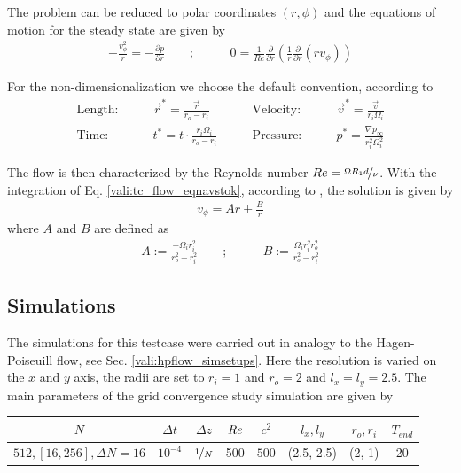 The problem can be reduced to polar coordinates $(r, \phi)$ and the equations of motion for the steady state are given by \citep{Kundu2012}
\begin{align}
    \label{vali:tc_flow_eqnavstok}
    -\frac{v^2_\phi}{r} = - \frac{\partial p}{\partial r} \qquad ;& \qquad 0 = \frac{1}{Re}\frac{\partial}{\partial r}\left(\frac{1}{r}\frac{\partial}{\partial r}(r v_\phi)\right)
\end{align}

\clearpage

For the non-dimensionalization we choose the default convention, according to  \citep{Chen2015}
\begin{align}
    \text{Length:}\qquad &  \vec{r}^* = \frac{\vec{r}}{r_o - r_i}  &
    \qquad \text{Velocity:}\qquad& \vec{v}^* =  \frac{\vec{v}}{r_i\Omega_i}\\
    \text{Time:}  \qquad & t^* = t \cdot \frac{r_i \Omega_i}{r_o - r_i}&
    \qquad  \text{Pressure:}\qquad & p^* = \frac{\nabla p_\infty}{r_i^2\Omega_i^2}
\end{align}


The flow is then characterized by the Reynolds number $Re = \nicefrac{\Omega R_1d}{\nu}$.
With the integration of Eq. \ref{vali:tc_flow_eqnavstok}, according to \citep{Kundu2012}, the solution is given by
\begin{align}
    v_\phi = Ar + \frac{B}{r}
\end{align}
where $A$ and $B$ are defined as
\begin{align}
    A := \frac{-\Omega_i r_i^2}{r^2_o - r^2_i} \qquad ;& \qquad B := \frac{\Omega_i r^2_i r^2_o}{r^2_o - r^2_i}
\end{align}

\subsection{Simulations}


The simulations for this testcase were carried out in analogy to the Hagen-Poiseuill flow, see Sec. \ref{vali:hpflow_simsetups}.
Here the resolution is varied on the $x$ and $y$ axis, the radii are set to $r_i=1$ and $r_o=2$ and $l_x=l_y=2.5$.
The main parameters of the grid convergence study simulation are  given by

\begin{center}
\vspace*{0.7ex}
\begin{tabular}{c|c|c|c|c|c|c|c }
 $ N  $                   & $\Delta t$ & $\Delta z$            & $\mbox{\textit{Re}}$  & $c^2$   & $l_x, l_y$ & $r_o, r_i$ & $T_{end}$\\
\hline
 $512, [16, 256], \Delta N = 16 $& $10^{-4}$ & $\nicefrac{1}{N}$ & 500     & $500$   & (2.5, 2.5) & (2, 1)     & 20\\
\end{tabular}
\vspace*{0.7ex}
\end{center}

